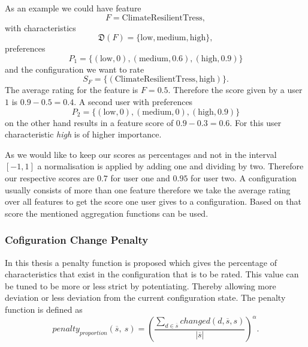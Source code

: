 As an example we could have feature
\begin{equation}
    F = \text{ClimateResilientTress},
\end{equation} with characteristics
\begin{equation}
    \mathfrak{D}(F)= \{\text{low}, \text{medium}, \text{high}\},
\end{equation}
preferences
\begin{equation}
    P_1 = \{(\text{low}, 0), (\text{medium},0.6), (\text{high},0.9) \}
\end{equation} 
and the configuration we want to rate
\begin{equation}
    S_F = \{(\text{ClimateResilientTress}, \text{high})\}.
\end{equation}
The average rating for the feature is $F = 0.5$. Therefore the score given by a user $1$ is $0.9-0.5 = 0.4$.
A second user with preferences 
\begin{equation}
    P_2 = \{(\text{low}, 0), (\text{medium},0), (\text{high},0.9) \}
\end{equation} 
on the other hand results in a feature score of $0.9-0.3=0.6$. For this user characteristic \emph{high} is of higher importance.

As we would like to keep our scores as percentages and not in the interval $[-1,1]$ a normalisation is applied by adding one and dividing by two. Therefore our respective scores are $0.7$ for user one and $0.95$ for user two. A configuration usually consists of more than one feature therefore we take the average rating over all features to get the score one user gives to a configuration. Based on that score the mentioned aggregation functions can be used.

\subsubsection{Cofiguration Change Penalty}

In this thesis a penalty function is proposed which gives the percentage of characteristics that exist in the configuration that is to be rated. This value can be tuned to be more or less strict by potentiating. Thereby allowing more deviation or less deviation from the current configuration state. The penalty function is defined as
\begin{equation}
    penalty_{proportion}(\overline{s},\ s) =  \left(\frac{\sum_{d \in \overline{s}} changed(d,\overline{s}, s)}{|\overline{s}|}\right)^\alpha.
\end{equation}
    

